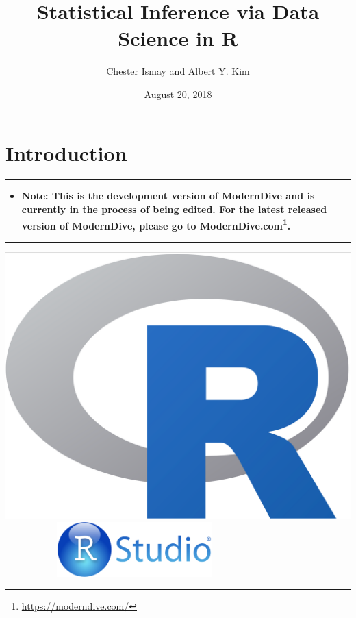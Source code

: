 \documentclass[12pt,]{krantz}
\title{Statistical Inference via Data Science in R}
\author{Chester Ismay and Albert Y. Kim}
\date{August 20, 2018}
\renewcommand{\href}[2]{#2\footnote{\url{#1}}}
\newenvironment{rmdblock}[1]
  {\begin{shaded*}
  \begin{itemize}
  \renewcommand{\labelitemi}{
    \raisebox{-.7\height}[0pt][0pt]{
    }
  }
  \item
  }
  {
  \end{itemize}
  \end{shaded*}
  }
\newenvironment{learncheck}
  {\begin{rmdblock}{warning}}
  {\end{rmdblock}}
\theoremstyle{definition}
\theoremstyle{definition}
\theoremstyle{definition}
\theoremstyle{remark}
\begin{document}
\maketitle


\thispagestyle{empty}

\begin{center}
\end{center}

\setlength{\abovedisplayskip}{-5pt}
\setlength{\abovedisplayshortskip}{-5pt}

{
\hypersetup{linkcolor=black}
\setcounter{tocdepth}{2}
\tableofcontents
}
\listoftables
\listoffigures
\mainmatter

\chapter{Introduction}\label{intro}

\begin{center}\rule{0.5\linewidth}{\linethickness}\end{center}

\begin{learncheck}
\textbf{Note: This is the development version of ModernDive and is
currently in the process of being edited. For the latest released
version of ModernDive, please go to
\href{https://moderndive.com/}{ModernDive.com}.}
\end{learncheck}

\begin{center}\rule{0.5\linewidth}{\linethickness}\end{center}

\includegraphics[height=0.20000\textwidth]{images/Rlogo.png} \hfill    
   
\includegraphics[width=0.45000\textwidth]{images/RStudio-Logo-Blue-Gradient.png}
\end{document}
